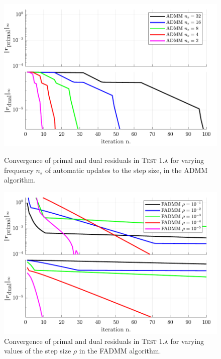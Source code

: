 \documentclass[AMA,STIX1COL]{WileyNJD-v2}
\begin{document}
\begin{figure}[!tbp]
  \centering
  \begin{minipage}[t]{0.48\textwidth}
    \includegraphics[width=\textwidth]{pics/t6_primdual_a_ns.pdf}
    \caption{Convergence of primal and dual residuals in \textsc{Test 1.a} for varying frequency $n_s$ of automatic updates to the step size, in the ADMM algorithm.}
		\label{fig:t6_primdual_a_ns}
  \end{minipage}
  \hfill
	\begin{minipage}[t]{0.48\textwidth}
    \includegraphics[width=\textwidth]{pics/t6_primdual_a_rho.pdf}
    \caption{Convergence of primal and dual residuals in \textsc{Test 1.a} for varying values of the step size $\rho$ in the FADMM algorithm.}
		\label{fig:t6_primdual_a_rho}
  \end{minipage}
\end{figure}
\end{document}
